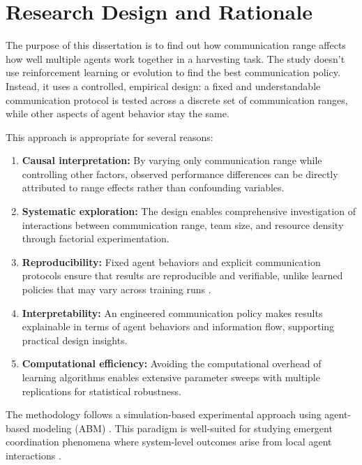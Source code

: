 
\section{Research Design and Rationale}

The purpose of this dissertation is to find out how communication range affects how well multiple agents work together in a harvesting task. The study doesn't use reinforcement learning or evolution to find the best communication policy. Instead, it uses a controlled, empirical design: a fixed and understandable communication protocol is tested across a discrete set of communication ranges, while other aspects of agent behavior stay the same.

This approach is appropriate for several reasons:

\begin{enumerate}
    \item \textbf{Causal interpretation:} By varying only communication range while controlling other factors, observed performance differences can be directly attributed to range effects rather than confounding variables.

    \item \textbf{Systematic exploration:} The design enables comprehensive investigation of interactions between communication range, team size, and resource density through factorial experimentation.

    \item \textbf{Reproducibility:} Fixed agent behaviors and explicit communication protocols ensure that results are reproducible and verifiable, unlike learned policies that may vary across training runs \citep{bonabeau2002agent}.

    \item \textbf{Interpretability:} An engineered communication policy makes results explainable in terms of agent behaviors and information flow, supporting practical design insights.

    \item \textbf{Computational efficiency:} Avoiding the computational overhead of learning algorithms enables extensive parameter sweeps with multiple replications for statistical robustness.
\end{enumerate}

The methodology follows a simulation-based experimental approach using agent-based modeling (ABM) \citep{gilbert2005simulation, north2007managing}. This paradigm is well-suited for studying emergent coordination phenomena where system-level outcomes arise from local agent interactions \citep{bonabeau2002agent}.

